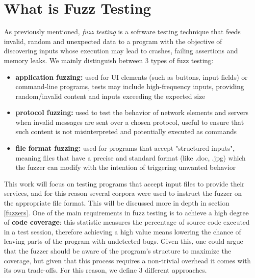 \documentclass[Lau,oneside]{sapthesis}%
\begin{document}
\section{What is Fuzz Testing}
As previously mentioned, \textit{fuzz testing} is a software testing technique that feeds invalid, random and unexpected data to a program with the objective of discovering inputs whose execution may lead to crashes, failing assertions and memory leaks.
\newline \newline
We mainly distinguish between 3 types of fuzz testing:
\begin{itemize}
    \item \textbf{application fuzzing:} used for UI elements (such as buttons, input fields) or command-line programs, tests may include high-frequency inputs, providing random/invalid content and inputs exceeding the expected size
    \item \textbf{protocol fuzzing:} used to test the behavior of network elements and servers when invalid messages are sent over a chosen protocol, useful to ensure that such content is not misinterpreted and potentially executed as commands
    \item  \textbf{file format fuzzing:} used for programs that accept "structured inputs", meaning files that have a precise and standard format (like .doc, .jpg) which the fuzzer can modify with the intention of triggering unwanted behavior
\end{itemize}
This work will focus on testing programs that accept input files to provide their services, and for this reason several corpora were used to instruct the fuzzer on the appropriate file format. This will be discussed more in depth in section \ref{fuzzers}.
\newline \newline
One of the main requirements in fuzz testing is to achieve a high degree of \textbf{code coverage}: this statistic measures the percentage of source code executed in a test session, therefore achieving a high value means lowering the chance of leaving parts of the program with undetected bugs. Given this, one could argue that the fuzzer should be aware of the program's structure to maximize the coverage, but given that this process requires a non-trivial overhead it comes with its own trade-offs.
\newline \newline
For this reason, we define 3 different approaches.
\newline \newline
\end{document}
